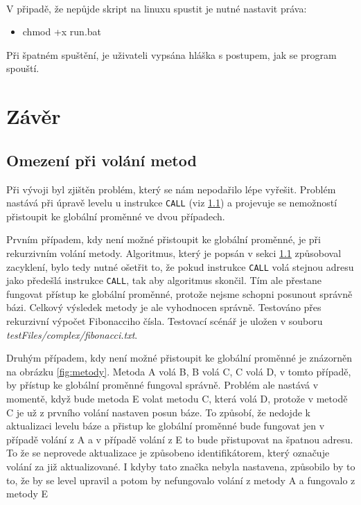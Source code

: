 \documentclass[12pt, a4paper]{article}
\begin{document}
\mbox{}\\
\noindent V připadě, že nepůjde skript na linuxu spustit je nutné nastavit práva:
\begin{itemize}
\item chmod +x run.bat
\end{itemize}

\noindent Při špatném spuštění, je uživateli vypsána hláška s postupem, jak se program spouští.


\section{Závěr}
\subsection{Omezení při volání metod} \label{fig:volani}
\noindent Při vývoji byl zjištěn problém, který se nám nepodařilo lépe vyřešit. Problém nastává při úpravě levelu u instrukce \texttt{CALL} (viz \ref{fig:volani}) a projevuje se nemožností přistoupit ke globální proměnné ve dvou případech.

Prvním případem, kdy není možné přistoupit ke globální proměnné, je při rekurzivním volání metody. Algoritmus, který je popsán v sekci \ref{fig:volani} způsoboval zacyklení, bylo tedy nutné ošetřit to, že pokud instrukce \texttt{CALL} volá stejnou adresu jako předešlá instrukce \texttt{CALL}, tak aby algoritmus skončil. Tím ale přestane fungovat přístup ke globální proměnné, protože nejsme schopni posunout správně bázi. Celkový výsledek metody je ale vyhodnocen správně. Testováno přes rekurzivní výpočet Fibonacciho čísla. Testovací scénář je uložen v souboru \textit{testFiles/complex/fibonacci.txt}.

Druhým případem, kdy není možné přistoupit ke globální proměnné je znázorněn na obrázku \ref{fig:metody}. Metoda \textsf{A} volá \textsf{B}, \textsf{B} volá \textsf{C}, \textsf{C} volá \textsf{D}, v tomto případě, by přístup ke globální proměnné fungoval správně. Problém ale nastává v momentě, když bude metoda E volat metodu \textsf{C}, která volá \textsf{D}, protože v metodě \textsf{C} je už z prvního volání nastaven posun báze. To způsobí, že nedojde k aktualizaci levelu báze a přistup ke globální proměnné bude fungovat jen v  případě volání z \textsf{A} a v případě volání z \textsf{E} to bude přistupovat na špatnou adresu. To že se neprovede aktualizace je způsobeno identifikátorem, který označuje volání za již aktualizované. I kdyby tato značka nebyla nastavena, způsobilo by to to, že by se level upravil a potom by nefungovalo volání z metody \textsf{A} a fungovalo z metody \textsf{E}
\end{document}

